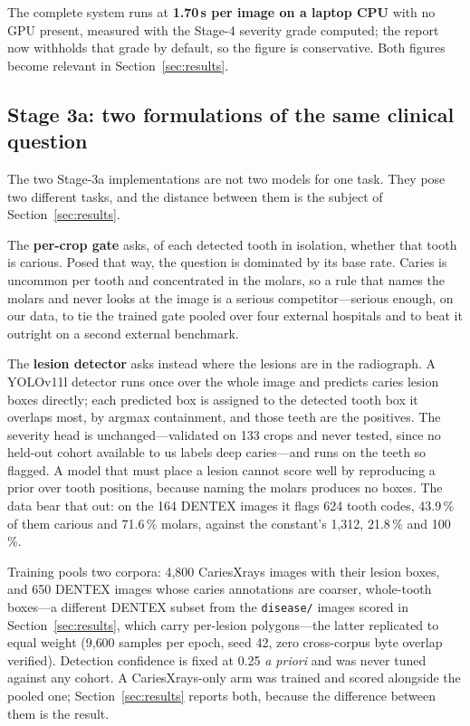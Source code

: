 \documentclass[conference]{IEEEtran}
\begin{document}
The complete system runs at \textbf{1.70\,s per image on a laptop CPU} with no
GPU present, measured with the Stage-4 severity grade computed; the report now
withholds that grade by default, so the figure is conservative. Both figures become relevant in Section~\ref{sec:results}.

\subsection{Stage 3a: two formulations of the same clinical question}
\label{sec:lesiondet}
The two Stage-3a implementations are not two models for one task. They pose two
different tasks, and the distance between them is the subject of
Section~\ref{sec:results}.

The \textbf{per-crop gate} asks, of each detected tooth in isolation, whether that
tooth is carious. Posed that way, the question is dominated by its base rate.
Caries is uncommon per tooth and concentrated in the molars, so a rule that names
the molars and never looks at the image is a serious competitor---serious enough,
on our data, to tie the trained gate pooled over four external hospitals and to
beat it outright on a second external benchmark.

The \textbf{lesion detector} asks instead where the lesions are in the radiograph.
A YOLOv11l detector runs once over the whole image and predicts caries lesion boxes
directly; each predicted box is assigned to the detected tooth box it overlaps most,
by argmax containment, and those teeth are the positives. The severity head is
unchanged---validated on 133 crops and never tested, since no held-out cohort
available to us labels deep caries---and runs on the teeth so flagged. A model that must place a lesion cannot
score well by reproducing a prior over tooth positions, because naming the molars
produces no boxes. The data bear that out: on the 164 DENTEX images it flags 624
tooth codes, 43.9\,\% of them carious and 71.6\,\% molars, against the constant's
1{,}312, 21.8\,\% and 100\,\%.

Training pools two corpora: 4{,}800 CariesXrays images with their lesion boxes, and
650 DENTEX images whose caries annotations are coarser, whole-tooth boxes---a
different DENTEX subset from the \texttt{disease/} images scored in
Section~\ref{sec:results}, which carry per-lesion polygons---the latter replicated
to equal weight (9{,}600 samples per epoch, seed 42, zero cross-corpus
byte overlap verified). Detection confidence is fixed at 0.25 \emph{a priori} and was
never tuned against any cohort. A CariesXrays-only arm was trained and scored
alongside the pooled one; Section~\ref{sec:results} reports both, because the
difference between them is the result.
\end{document}
